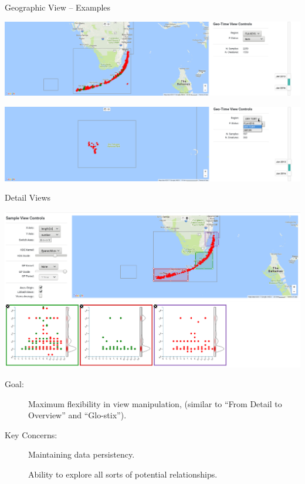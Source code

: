 \documentclass{beamer}
\begin{document}
\begin{frame}{Geographic View -- Examples}

  \includegraphics[width=\textwidth]{./img/geo_FLAKEYS_both.png}

  \includegraphics[width=\textwidth]{./img/geo_DRYTORT_nprot.png}

\end{frame}

\renewcommand{\footnotesize}{\scriptsize}

\begin{frame}{Detail Views}

  \centerline{
  \includegraphics[width=.9\textwidth]{./img/fview.png}
  }

  \begin{description}

    \item[Goal:]  Maximum flexibility in view manipulation, (similar to ``From
      Detail to Overview'' and ``Glo-stix'').
      \nocite{van2014multivariate}\nocite{stolper2014glo}

    \item[Key Concerns:]  Maintaining data persistency.

      Ability to explore all sorts of potential relationships.

  \end{description}

\end{frame}
\end{document}
